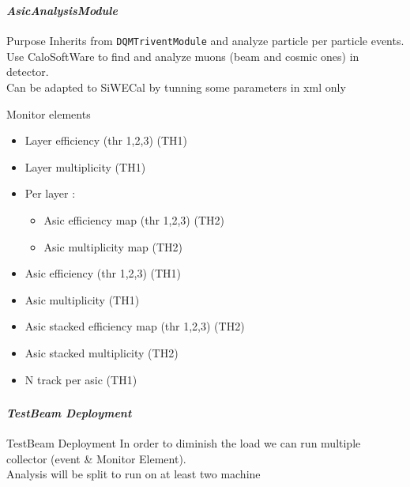 \documentclass[8pt]{beamer}
\begin{document}
  \begin{frame}[containsverbatim]
    \frametitle{\secname}
    \framesubtitle{\textit{AsicAnalysisModule}}
    \begin{block}{Purpose}
      Inherits from \verb|DQMTriventModule| and analyze particle per particle events. \\
      Use CaloSoftWare to find and analyze muons (beam and cosmic ones) in detector. \\
      Can be adapted to SiWECal by tunning some parameters in xml only
    \end{block}

    \begin{block}{Monitor elements}
      \begin{itemize}
        \item Layer efficiency (thr 1,2,3) (TH1)
        \item Layer multiplicity (TH1)
        \item Per layer :
        \begin{itemize}
          \item Asic efficiency map (thr 1,2,3) (TH2)
          \item Asic multiplicity map (TH2)
        \end{itemize}
        \item Asic efficiency (thr 1,2,3) (TH1)
        \item Asic multiplicity (TH1)
        \item Asic stacked efficiency map (thr 1,2,3) (TH2)
        \item Asic stacked multiplicity (TH2)
        \item N track per asic (TH1)
      \end{itemize}
    \end{block}
  \end{frame}


  \begin{frame}
  \frametitle{\secname}
  \framesubtitle{\textit{TestBeam Deployment}}

  \begin{block}{TestBeam Deployment}
    In order to diminish the load we can run multiple collector (event \& Monitor Element).\\
    Analysis will be split to run on at least two machine

  \end{block}
  \end{frame}
\end{document}
